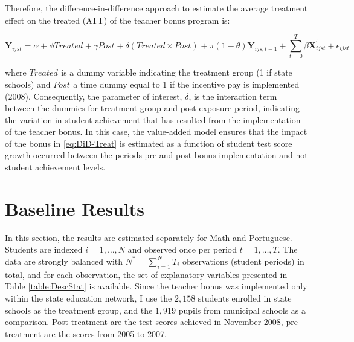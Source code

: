 \documentclass[a4paper, 12pt]{article}
\begin{document}
Therefore, the difference-in-difference approach to estimate the average treatment effect on the treated (ATT) of the teacher bonus program is:


\begin{equation} \label{eq:DiD-Treat}
\mathbf{Y}_{ijst} = \alpha + \phi Treated_{} + \gamma Post_{} + \delta (Treated \times Post)_{} + \pi (1 - \theta) \mathbf{Y}_{ijs,t-1} + \sum_{t=0}^T \beta \mathbf{X}_{ijst}^{\prime} + \epsilon_{ijst} 
\end{equation}



where $Treated_{}$ is a dummy variable indicating the treatment group (1 if state schools) and $Post_{}$ a time dummy equal to 1 if the incentive pay is implemented (2008). Consequently, the parameter of interest, $\delta$, is the interaction term between the dummies for treatment group and post-exposure period, indicating the variation in student achievement that has resulted from the implementation of the teacher bonus. In this case, the value-added model ensures that the impact of the bonus in \eqref{eq:DiD-Treat} is estimated as a function of student test score growth \textemdash occurred between the periods pre and post bonus implementation \textemdash and not student achievement levels.









\section{Baseline Results} \label{Paper3-Results}


In this section, the results are estimated separately for Math and Portuguese. Students are indexed $i=1, \dotsc, N$ and observed once per period $t=1, \dotsc, T$. The data are strongly balanced with $N^*=\sum_{i=1}^N T_i$ observations (student periods) in total, and for each observation, the set of explanatory variables presented in Table \ref{table:DescStat} is available. Since the teacher bonus was implemented only within the state education network, I use the $2,158$ students enrolled in state schools as the treatment group, and the $1,919$ pupils from municipal schools as a comparison. Post-treatment are the test scores achieved in November 2008, pre-treatment are the scores from 2005 to 2007.
\end{document}
